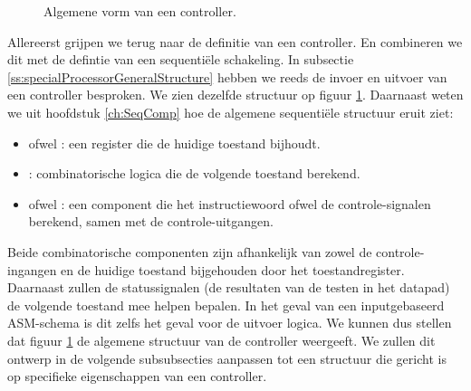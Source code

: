 \begin{figure}[hbt]
\caption{Algemene vorm van een controller.}
\label{fig:generalStructureController}
\end{figure}
Allereerst grijpen we terug naar de definitie van een controller. En combineren we dit met de defintie van een sequenti\"ele schakeling. In subsectie \ref{ss:specialProcessorGeneralStructure} hebben we reeds de invoer en uitvoer van een controller besproken. We zien dezelfde structuur op figuur \ref{fig:generalStructureController}. Daarnaast weten we uit hoofdstuk \ref{ch:SeqComp} hoe de algemene sequenti\"ele structuur eruit ziet:
\begin{itemize}
 \item {} ofwel : een register die de huidige toestand bijhoudt.
 \item {}: combinatorische logica die de volgende toestand berekend.
 \item {} ofwel : een component die het instructiewoord ofwel de controle-signalen berekend, samen met de controle-uitgangen.
\end{itemize}
Beide combinatorische componenten zijn afhankelijk van zowel de controle-ingangen en de huidige toestand bijgehouden door het toestandregister. Daarnaast zullen de statussignalen (de resultaten van de testen in het datapad) de volgende toestand mee helpen bepalen. In het geval van een inputgebaseerd ASM-schema is dit zelfs het geval voor de uitvoer logica. We kunnen dus stellen dat figuur \ref{fig:generalStructureController} de algemene structuur van de controller weergeeft. We zullen dit ontwerp in de volgende subsubsecties aanpassen tot een structuur die gericht is op specifieke eigenschappen van een controller.

